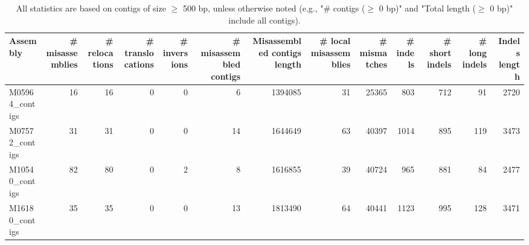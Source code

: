\documentclass[12pt,a4paper]{article}
\begin{document}
\begin{table}[ht]
\begin{center}
\caption{All statistics are based on contigs of size $\geq$ 500 bp, unless otherwise noted (e.g., "\# contigs ($\geq$ 0 bp)" and "Total length ($\geq$ 0 bp)" include all contigs).}
\begin{tabular}{|l*{12}{|r}|}
\hline
Assembly & \# misassemblies &     \# relocations &     \# translocations &     \# inversions & \# misassembled contigs & Misassembled contigs length & \# local misassemblies & \# mismatches & \# indels &     \# short indels &     \# long indels & Indels length \\ \hline
M05964\_contigs & 16 & 16 & 0 & 0 & 6 & 1394085 & 31 & 25365 & 803 & 712 & 91 & 2720 \\ \hline
M07572\_contigs & 31 & 31 & 0 & 0 & 14 & 1644649 & 63 & 40397 & 1014 & 895 & 119 & 3473 \\ \hline
M10540\_contigs & 82 & 80 & 0 & 2 & 8 & 1616855 & 39 & 40724 & 965 & 881 & 84 & 2477 \\ \hline
M16180\_contigs & 35 & 35 & 0 & 0 & 13 & 1813490 & 64 & 40441 & 1123 & 995 & 128 & 3471 \\ \hline
\end{tabular}
\end{center}
\end{table}
\end{document}
